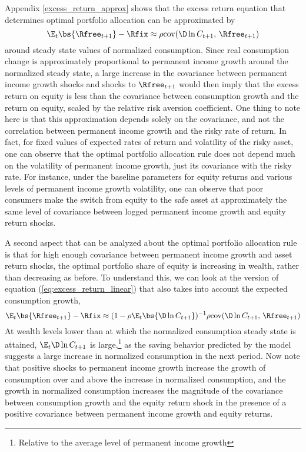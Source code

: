 Appendix \ref{excess_return_approx} shows that the excess return equation that determines optimal portfolio allocation can be approximated by
\begin{equation}\label{eq:excess_return_linear}
    \E_{t}\bs{\Rfree_{t+1}} - \Rfix \approx \rho\text{cov}(\D \ln C_{t+1},\,\Rfree_{t+1})
\end{equation}
around steady state values of normalized consumption. Since real consumption change is approximately proportional to permanent income growth around the normalized steady state, a large increase in the covariance between permanent income growth shocks and shocks to $\Rfree_{t+1}$ would then imply that the excess return on equity is less than the covariance between consumption growth and the return on equity, scaled by the relative risk aversion coefficient. One thing to note here is that this approximation depends solely on the covariance, and not the correlation between permanent income growth and the risky rate of return. In fact, for fixed values of expected rates of return and volatility of the risky asset, one can observe that the optimal portfolio allocation rule does not depend much on the volatility of permanent income growth, just its covariance with the risky rate. For instance, under the baseline parameters for equity returns and various levels of permanent income growth volatility, one can observe that poor consumers make the switch from equity to the safe asset at approximately the same level of covariance between logged permanent income growth and equity return shocks.

A second aspect that can be analyzed about the optimal portfolio allocation rule is that for high enough covariance between permanent income growth and asset return shocks, the optimal portfolio share of equity is increasing in wealth, rather than decreasing as before. To understand this, we can look at the version of equation (\ref{eq:excess_return_linear}) that also takes into account the expected consumption growth,
\[
    \E_{t}\bs{\Rfree_{t+1}} - \Rfix \approx (1-\rho\E_{t}\bs{\D\ln C_{t+1}})^{-1}\rho\text{cov}(\D \ln C_{t+1},\,\Rfree_{t+1})
\]
At wealth levels lower than at which the normalized consumption steady state is attained, $\E_{t}\D\ln C_{t+1}$ is large,\footnote{Relative to the average level of permanent income growth} as the saving behavior predicted by the model suggests a large increase in normalized consumption in the next period. Now note that positive shocks to permanent income growth increase the growth of consumption over and above the increase in normalized consumption, and the growth in normalized consumption increases the magnitude of the covariance between consumption growth and the equity return shock in the presence of a positive covariance between permanent income growth and equity returns.

